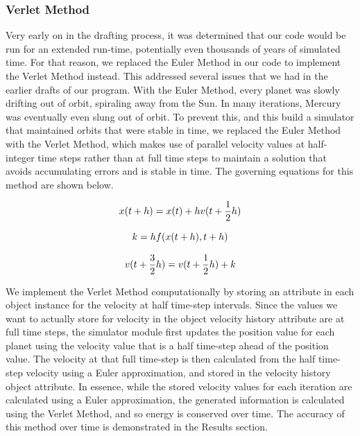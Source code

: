 \documentclass[a4paper,12pt]{article} %
\numberwithin{equation}{section} %
\numberwithin{figure}{section} %
\begin{document}
\subsubsection{Verlet Method}
Very early on in the drafting process, it was determined that our code would be run for an extended run-time, potentially even thousands of years of simulated time. For that reason, we replaced the Euler Method in our code to implement the Verlet Method instead. This addressed several issues that we had in the earlier drafts of our program. With the Euler Method, every planet was slowly drifting out of orbit, spiraling away from the Sun. In many iterations, Mercury was eventually even slung out of orbit. To prevent this, and this build a simulator that maintained orbits that were stable in time, we replaced the Euler Method with the Verlet Method, which makes use of parallel velocity values at half-integer time steps rather than at full time steps to maintain a solution that avoids accumulating errors and is stable in time. The governing equations for this method are shown below.

\begin{equation}
\centering
x(t+h)=x(t)+hv(t+\frac{1}{2}h)
\end{equation}

\begin{equation}
\centering
k=hf(x(t+h),t+h)
\end{equation}

\begin{equation}
\centering
v(t+\frac{3}{2}h)=v(t+\frac{1}{2}h) + k
\end{equation}

We implement the Verlet Method computationally by storing an attribute in each object instance for the velocity at half time-step intervals. Since the values we want to actually store for velocity in the object velocity history attribute are at full time steps, the simulator module first updates the position value for each planet using the velocity value that is a half time-step ahead of the position value. The velocity at that full time-step is then calculated from the half time-step velocity using a Euler approximation, and stored in the velocity history object attribute. In essence, while the stored velocity values for each iteration are calculated using a Euler approximation, the generated information is calculated using the Verlet Method, and so energy is conserved over time. The accuracy of this method over time is demonstrated in the Results section.
\end{document}
